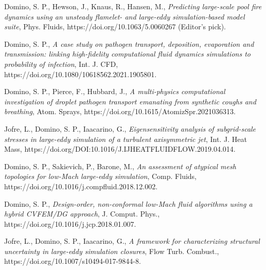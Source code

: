 \documentclass[letterpaper]{twentysecondcv_spd} %
\begin{document}
\begin{twentyshort} %


 {Domino, S. P., Hewson, J., Knaus, R., Hansen, M., \textit{Predicting large-scale pool fire dynamics using an unsteady flamelet- and large-eddy simulation-based model suite}, Phys. Fluids, https://doi.org/10.1063/5.0060267 (Editor's pick).}

 {Domino,  S. P., \textit{A case study on pathogen transport, deposition, evaporation and transmission: linking high-fidelity computational fluid dynamics simulations to probability of infection}, Int. J. CFD, https://doi.org/10.1080/10618562.2021.1905801.}

 {Domino, S. P., Pierce, F., Hubbard, J.,  \textit{A multi-physics computational investigation of droplet pathogen transport emanating from synthetic coughs and breathing}, Atom. Sprays, https://doi.org/10.1615/AtomizSpr.2021036313.}

 {Jofre, L., Domino, S. P., Iaacarino, G.,  \textit{Eigensensitivity analysis of subgrid-scale stresses in large-eddy simulation of a turbulent axisymmetric jet}, Int. J. Heat Mass, https://doi.org/DOI:10.1016/J.IJHEATFLUIDFLOW.2019.04.014.}

 {Domino, S. P., Sakievich, P., Barone, M., \textit{An assessment of atypical mesh topologies for low-Mach large-eddy simulation}, Comp. Fluids, https://doi.org/10.1016/j.compfluid.2018.12.002.}

 {Domino, S. P., \textit{Design-order, non-conformal low-Mach fluid algorithms using a hybrid CVFEM/DG approach}, J. Comput. Phys., https://doi.org/10.1016/j.jcp.2018.01.007.}

 {Jofre, L., Domino, S. P.,  Iaacarino, G., \textit{A framework for characterizing structural uncertainty in large-eddy simulation closures}, Flow Turb. Combust., https://doi.org/10.1007/s10494-017-9844-8.}

\end{twentyshort} 

\end{document}
